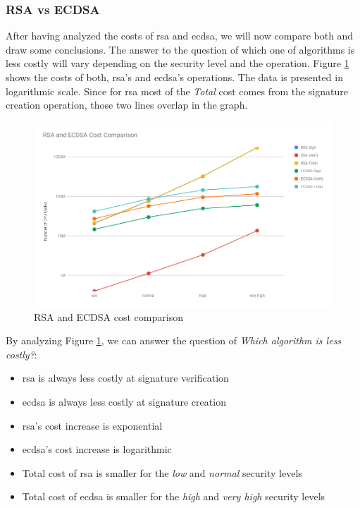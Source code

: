 \subsubsection{RSA vs ECDSA} \label{sec:rsa-vs-ecdsa}

After having analyzed the costs of \gls{rsa} and \gls{ecdsa}, we will now compare both and draw some conclusions. The answer to the
question of which one of algorithms is less costly will vary depending on the security level and the operation. Figure \ref{fig:ecdsa-rsa-costs-all}
shows the costs of both, \gls{rsa}'s and \gls{ecdsa}'s operations. The data is presented in logarithmic scale. Since for \gls{rsa} most
of the \textit{Total} cost comes from the signature creation operation, those two lines overlap in the graph.

\begin{figure}
  \centering
  \includegraphics[width=1.0\textwidth]{img/rsa_ecdsa_costs_all.png}
  \centering \caption{\label{fig:ecdsa-rsa-costs-all} RSA and ECDSA cost comparison}
\end{figure}

By analyzing Figure \ref{fig:ecdsa-rsa-costs-all}, we can answer the question of \textit{Which algorithm is less costly?}:

\begin{itemize}
  \item \gls{rsa} is always less costly at signature verification
  \item \gls{ecdsa} is always less costly at signature creation
  \item \gls{rsa}'s cost increase is exponential
  \item \gls{ecdsa}'s cost increase is logarithmic
  \item Total cost of \gls{rsa} is smaller for the \textit{low} and \textit{normal} security levels
  \item Total cost of \gls{ecdsa} is smaller for the \textit{high} and \textit{very high} security levels
\end{itemize}

